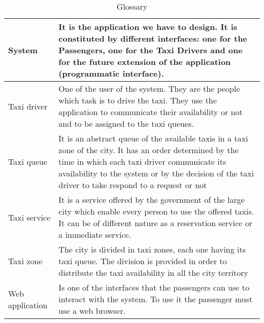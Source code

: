 \begin{table}[]
\begin{tabularx}{\textwidth}{|l|X|}
System & It is the application we have to design. It is constituted by different interfaces: one for the Passengers, one for the Taxi Drivers and one for the future extension of the application (programmatic interface). \\ \hline
Taxi driver & One of the user of the system. They are the people which task is to drive the taxi. They use the application to communicate their availability or not and to be assigned to the taxi queues. \\ \hline
Taxi queue & It is an abstract queue of the available taxis in a taxi zone of the city. It has an order determined by the time in which each taxi driver communicate its availability to the system or by the decision of the taxi driver to take respond to a request or not \\ \hline
Taxi service & It is a service offered by the government of the large city which enable every person to use the offered taxis. It can be of different nature as a reservation service or a immediate service. \\ \hline
Taxi zone & The city is divided in taxi zones, each one having its taxi queue. The division is provided in order to distribute the taxi availability in all the city territory \\ \hline
Web application & Is one of the interfaces that the passengers can use to interact with the system. To use it the passenger must use a web browser. \\ \hline
\end{tabularx}

\caption{Glossary}
\label{my-label}
\end{table}